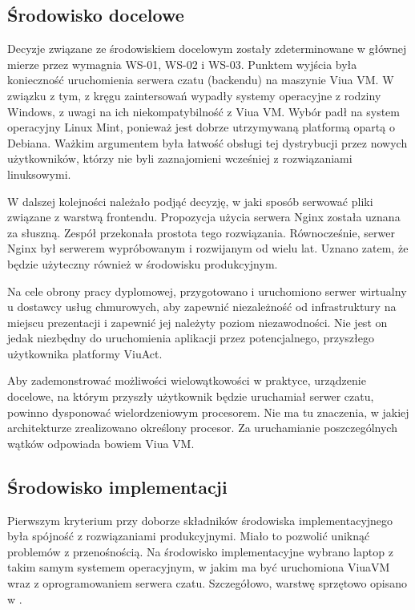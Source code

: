 \subsection{Środowisko docelowe}
Decyzje związane ze środowiskiem docelowym zostały zdeterminowane w głównej
mierze przez wymagnia WS-01, WS-02 i WS-03. Punktem wyjścia była konieczność
uruchomienia serwera czatu (backendu) na maszynie Viua VM. W związku z tym,
z kręgu zaintersowań wypadły systemy operacyjne z rodziny Windows, z uwagi na
ich niekompatybilność z Viua VM. Wybór padł na system operacyjny Linux Mint,
ponieważ jest dobrze utrzymywaną platformą opartą o Debiana. Ważkim argumentem
była łatwość obsługi tej dystrybucji przez nowych użytkowników, którzy nie byli zaznajomieni wcześniej z rozwiązaniami linuksowymi.

W dalszej kolejności należało podjąć decyzję, w jaki sposób serwować pliki
związane z warstwą frontendu. Propozycja użycia serwera Nginx została uznana
za słuszną. Zespół przekonała prostota tego rozwiązania. Równocześnie, serwer
Nginx był serwerem wypróbowanym i rozwijanym od wielu lat. Uznano zatem, że
będzie użyteczny również w środowisku produkcyjnym.

Na cele obrony pracy dyplomowej, przygotowano i uruchomiono serwer wirtualny u
dostawcy usług chmurowych, aby zapewnić niezależność od infrastruktury na
miejscu prezentacji i zapewnić jej należyty poziom niezawodności. Nie jest
on jedak niezbędny do uruchomienia aplikacji przez potencjalnego, przyszłego
użytkownika platformy ViuAct.

Aby zademonstrować możliwości wielowątkowości w praktyce, urządzenie docelowe,
na którym przyszły użytkownik będzie uruchamiał serwer czatu, powinno dysponować
wielordzeniowym procesorem. Nie ma tu znaczenia, w jakiej architekturze
zrealizowano określony procesor. Za uruchamianie poszczególnych wątków odpowiada
bowiem Viua VM.

\subsection{Środowisko implementacji}
Pierwszym kryterium przy doborze składników środowiska implementacyjnego była
spójność z rozwiązaniami produkcyjnymi. Miało to pozwolić uniknąć problemów
z przenośnością. Na środowisko implementacyjne wybrano laptop z takim samym
systemem operacyjnym, w jakim ma być uruchomiona ViuaVM wraz z oprogramowaniem
serwera czatu. Szczegółowo, warstwę sprzętowo opisano w .

